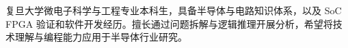 

\begin{cvparagraph}

  复旦大学微电子科学与工程专业本科生，具备半导体与电路知识体系，以及 SoC FPGA 验证和软件开发经历。擅长通过问题拆解与逻辑推理开展分析，希望将技术理解与编程能力应用于半导体行业研究。
\end{cvparagraph}
